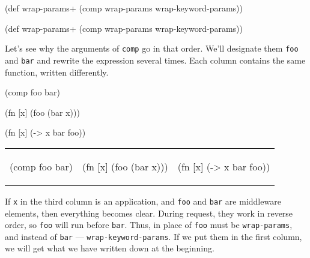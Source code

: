 
\ifx\DEVICETYPE\MOBILE

\begin{clojure}
(def wrap-params+
  (comp wrap-params wrap-keyword-params))
\end{clojure}

\else

\begin{clojure}
(def wrap-params+ (comp wrap-params wrap-keyword-params))
\end{clojure}

\fi

Let's see why the arguments of \verb|comp| go in that order. We'll designate them \verb|foo| and \verb|bar| and rewrite the expression several times. Each column contains the same function, written differently.

\ifx\DEVICETYPE\MOBILE

\begin{clojure}
(comp foo bar)
\end{clojure}

\splitter

\begin{clojure}
(fn [x]
  (foo (bar x)))
\end{clojure}

\splitter

\begin{clojure}
(fn [x] (-> x
            bar
            foo))
\end{clojure}

\else

\noindent
\begin{tabular}{ @{}p{3.2cm} @{}p{3.5cm} @{}p{3.5cm} }

\begin{clojure}
(comp foo bar)
\end{clojure}

&

\begin{clojure}
(fn [x]
  (foo (bar x)))
\end{clojure}

&

\begin{clojure}
(fn [x] (-> x
            bar
            foo))
\end{clojure}

\end{tabular}


\fi

If \verb|x| in the third column is an application, and \verb|foo| and \verb|bar| are middleware elements, then everything becomes clear. During request, they work in reverse order, so \verb|foo| will run before \verb|bar|. Thus, in place of \verb|foo| must be \verb|wrap-params|, and instead of \verb|bar| — \verb|wrap-keyword-params|. If we put them in the first column, we will get what we have written down at the beginning.


